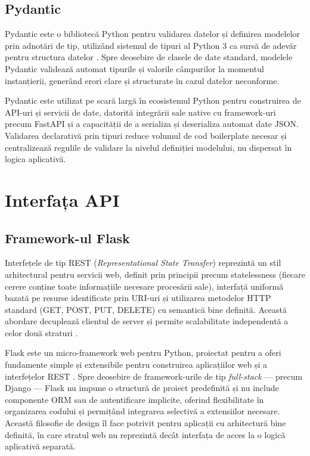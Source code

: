 \documentclass[12pt, a4paper, oneside, romanian]{teza-upb}
\begin{document}
\subsection{Pydantic}

Pydantic este o bibliotecă Python pentru validarea datelor și definirea modelelor prin adnotări de tip, utilizând sistemul de tipuri al Python 3 ca sursă de adevăr pentru structura datelor \cite{pydantic_doc}. Spre deosebire de clasele de date standard, modelele Pydantic validează automat tipurile și valorile câmpurilor la momentul instanțierii, generând erori clare și structurate în cazul datelor neconforme.

Pydantic este utilizat pe scară largă în ecosistemul Python pentru construirea de API-uri și servicii de date, datorită integrării sale native cu framework-uri precum FastAPI și a capacității de a serializa și deserializa automat date JSON. Validarea declarativă prin tipuri reduce volumul de cod boilerplate necesar și centralizează regulile de validare la nivelul definiției modelului, nu dispersat în logica aplicativă.

\section{Interfața API}

\subsection{Framework-ul Flask}

Interfețele de tip REST (\textit{Representational State Transfer}) reprezintă un stil arhitectural pentru servicii web, definit prin principii precum statelessness (fiecare cerere conține toate informațiile necesare procesării sale), interfață uniformă bazată pe resurse identificate prin URI-uri și utilizarea metodelor HTTP standard (GET, POST, PUT, DELETE) cu semantică bine definită. Această abordare decuplează clientul de server și permite scalabilitate independentă a celor două straturi \cite{flask_doc}.

Flask este un micro-framework web pentru Python, proiectat pentru a oferi fundamente simple și extensibile pentru construirea aplicațiilor web și a interfețelor REST \cite{flask_doc}. Spre deosebire de framework-urile de tip \textit{full-stack} — precum Django — Flask nu impune o structură de proiect predefinită și nu include componente ORM sau de autentificare implicite, oferind flexibilitate în organizarea codului și permițând integrarea selectivă a extensiilor necesare. Această filosofie de design îl face potrivit pentru aplicații cu arhitectură bine definită, în care stratul web nu reprezintă decât interfața de acces la o logică aplicativă separată.
\end{document}
